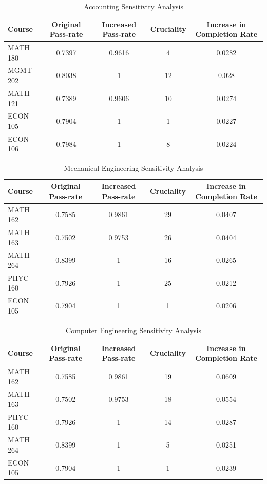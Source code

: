 \documentclass[botnum, fleqn]{unmeethesis}
\begin{document}
      \begin{table}[!h]
      \tiny
      \begin{tabular}{l*{4}{c}}
      Course & Original Pass-rate & Increased Pass-rate & Cruciality & Increase in Completion Rate \\
      \hline
      MATH 180 & 0.7397 & 0.9616 & 4 & 0.0282 \\
      MGMT 202 & 0.8038 & 1 & 12 & 0.028 \\
      MATH 121 & 0.7389 & 0.9606 & 10 & 0.0274 \\
      ECON 105 & 0.7904 & 1 & 1 & 0.0227 \\
      ECON 106 & 0.7984 & 1 & 8 & 0.0224 \\
      \end{tabular}
      \caption{Accounting Sensitivity Analysis} 
      \label{tab:accounting_sensitivity}
      \end{table}

      \begin{table}[!h]
      \tiny
      \begin{tabular}{l*{4}{c}}
      Course & Original Pass-rate & Increased Pass-rate & Cruciality & Increase in Completion Rate \\
      \hline
      MATH 162 & 0.7585 & 0.9861 & 29 & 0.0407 \\
      MATH 163 & 0.7502 & 0.9753 & 26 & 0.0404 \\
      MATH 264 & 0.8399 & 1 & 16 & 0.0265 \\
      PHYC 160 & 0.7926 & 1 & 25 & 0.0212 \\
      ECON 105 & 0.7904 & 1 & 1 & 0.0206 \\
      \end{tabular}
      \caption{Mechanical Engineering Sensitivity Analysis}
      \label{tab:me_sensitivity}
      \end{table}

      \begin{table}[!h]
      \tiny
      \begin{tabular}{l*{4}{c}}
      Course & Original Pass-rate & Increased Pass-rate & Cruciality & Increase in Completion Rate \\
      \hline
      MATH 162 & 0.7585 & 0.9861 & 19 & 0.0609 \\
      MATH 163 & 0.7502 & 0.9753 & 18 & 0.0554 \\
      PHYC 160 & 0.7926 & 1 & 14 & 0.0287 \\
      MATH 264 & 0.8399 & 1 & 5 & 0.0251 \\
      ECON 105 & 0.7904 & 1 & 1 & 0.0239 \\
      \end{tabular}
      \caption{Computer Engineering Sensitivity Analysis}
      \label{tab:cpe_sensitivity}
      \end{table}
\end{document}
